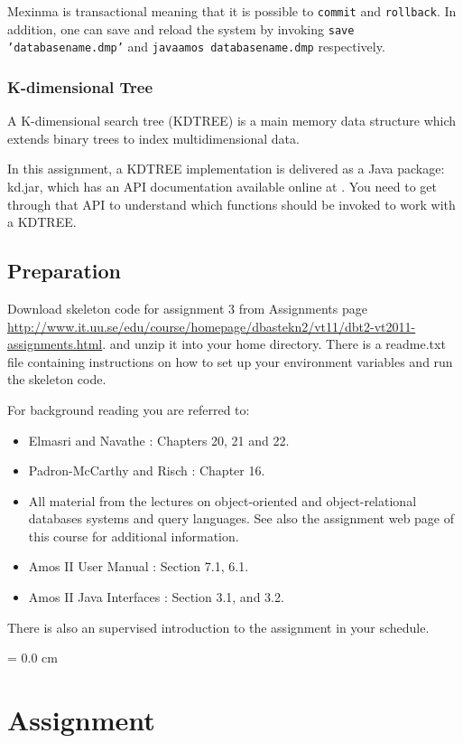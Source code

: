 \documentclass[12pt]{article}
\begin{document}
Mexinma is transactional meaning that it is possible to \texttt{commit} and \texttt{rollback}. In addition, one can save and reload the system by invoking \texttt{save 'databasename.dmp'} and \texttt{javaamos databasename.dmp} respectively.

\subsubsection{K-dimensional Tree}
A K-dimensional search tree (KDTREE) is a main memory data structure
which extends binary trees to index multidimensional data.

In this assignment, a KDTREE implementation is delivered as a Java
package: kd.jar, which has an API documentation available online at
\cite{LEV11}. You need to get through that API to understand which
functions should be invoked to work with a KDTREE.

\subsection{Preparation}

Download skeleton code for assignment 3 from Assignments page
\url{http://www.it.uu.se/edu/course/homepage/dbastekn2/vt11/dbt2-vt2011-assignments.html}. and
unzip it into your home directory. There is a readme.txt file
containing instructions on how to set up your environment variables
and run the skeleton code.

For background reading you are referred
to:

\begin{itemize}
\item Elmasri and Navathe \cite{EN10}: Chapters 20, 21 and 22.
\item Padron-McCarthy and Risch \cite{PMR05}: Chapter 16.
\item All material from the lectures on object-oriented and object-relational databases systems and query languages. See also the assignment web page of this course for additional information.
\item Amos II User Manual \cite{AmosII}: Section 7.1, 6.1.
\item Amos II Java Interfaces \cite{AmosIIJava}: Section 3.1, and 3.2.
\end{itemize}
There is also an supervised introduction to the assignment in your schedule.

\headsep = 0.0 cm


\section{Assignment} \label{assignment}
\end{document}
